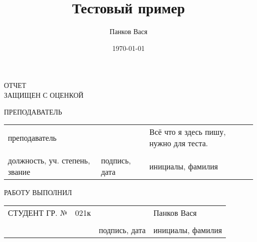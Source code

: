 \documentclass[14pt]{extarticle}
\author{Панков Вася}
\date{\today}
\title{Тестовый пример}
\begin{document}
\begin{titlepage}


\vspace{32pt}


\vspace{60pt}

\raggedright{ОТЧЕТ \\
ЗАЩИЩЕН С ОЦЕНКОЙ}
\vspace{14pt}

\raggedright{ПРЕПОДАВАТЕЛЬ}

\vspace{12pt}

\begin{tabularx}{\textwidth}{ >{\centering\arraybackslash}X >{\centering\arraybackslash}X >{\centering\arraybackslash}X }
	 преподаватель & & Всё что я здесь пишу, нужно для теста. \\ 
	 \hrulefill & \hrulefill & \hrulefill \\ 
\footnotesize{должность, уч. степень, звание} & \footnotesize{подпись, дата} & \footnotesize{инициалы, фамилия} \\ 
\end{tabularx} 
 
\vspace{48pt} 


\vspace{76pt} 


\vspace*{\fill} 

\raggedright{РАБОТУ ВЫПОЛНИЛ} 

\vspace{10pt} 

\begin{tabularx}{\textwidth}{>{\raggedright\arraybackslash}X  >{\centering\arraybackslash}X >{\centering\arraybackslash}X >{\centering\arraybackslash}X }
	 СТУДЕНТ ГР. № & 021к & & Панков Вася \\ 
	 & \hrulefill & \hrulefill & \hrulefill \\ 
	 &  & \footnotesize{подпись, дата} & \footnotesize{инициалы, фамилия} \\ 
\end{tabularx} 
 
\vspace*{\fill} 


\end{titlepage}
\end{document}
